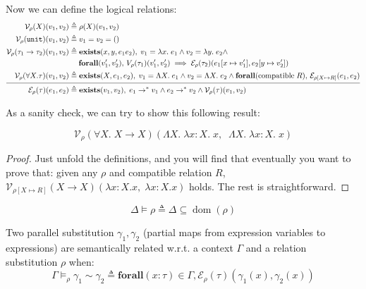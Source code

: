 \documentclass{notes}
\newcommand{\unit}{()}
\newcommand{\Unit}{\texttt{unit}}
\newcommand{\V}{\mathcal{V}}
\newcommand{\E}{\mathcal{E}}
\begin{document}
Now we can define the logical relations:
\begin{align*}
  \V_\rho(X)(v_1,v_2) &\triangleq \rho(X)(v_1,v_2)\\
  \V_\rho(\Unit)(v_1,v_2) &\triangleq v_1=v_2=\unit\\
  \V_\rho(\tau_1\to\tau_2)(v_1,v_2) &\triangleq \textbf{exists}(x,y,e_1e_2),\;v_1=\lambda x.\;e_1\land v_2=\lambda y.\;e_2\land\\&\quad\;\textbf{forall}(v_1',v_2'),\,V_\rho(\tau_1)(v_1',v_2')\implies \E_\rho(\tau_2)(e_1[x\mapsto v_1'],e_2[y\mapsto v_2'])\\
  \V_\rho(\forall X.\tau)(v_1,v_2) &\triangleq \textbf{exists}(X,e_1,e_2),\;v_1=\Lambda X.\;e_1\land v_2=\Lambda X.\;e_2\land \textbf{forall}(\text{compatible}\;R),\,\E_{\rho[X\mapsto R]}(e_1,e_2)\\
  \noalign{\smallskip} \hline \noalign{\smallskip}
  \E_\rho(\tau)(e_1,e_2) &\triangleq \textbf{exists}(v_1,v_2),\;e_1\to^*v_1\land e_2\to^*v_2\land \V_\rho(\tau)(v_1,v_2)
\end{align*}

As a sanity check, we can try to show this following result:
\begin{prop}
  \[\V_\rho(\forall X.\;X\to X)(\Lambda X.\;\lambda x:X.\;x,\;\;\Lambda X.\;\lambda x:X.\;x)\]
\end{prop}

\begin{proof}
  Just unfold the definitions, and you will find that eventually you want to prove that: given any $\rho$ and compatible relation $R$, $\V_{\rho[X\mapsto R]}(X\to X)(\lambda x:X.x,\;\lambda x:X.x)$ holds. The rest is straightforward.
\end{proof}

\begin{defn}
  \[\Delta\vDash \rho \triangleq \Delta\subseteq \operatorname{dom}(\rho)\]
\end{defn}

\begin{defn}
  Two parallel substitution $\gamma_1,\gamma_2$ (partial maps from expression variables to expressions) are semantically related w.r.t. a context $\Gamma$ and a relation substitution $\rho$ when:
  \[\Gamma\vDash_\rho \gamma_1\sim \gamma_2 \triangleq \textbf{forall} (x:\tau)\in \Gamma, \E_\rho(\tau)(\gamma_1(x),\gamma_2(x))\]
\end{defn}
\end{document}

